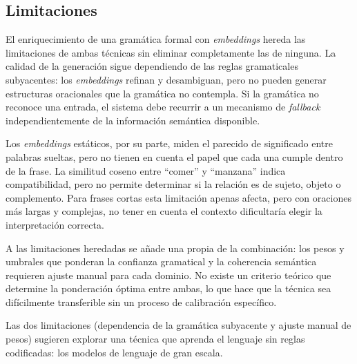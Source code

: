 \subsection{Limitaciones}
\label{sec:f2-limitaciones}

El enriquecimiento de una gramática formal con \textit{embeddings} hereda las limitaciones de ambas técnicas sin eliminar completamente las de ninguna. La calidad de la generación sigue dependiendo de las reglas gramaticales subyacentes: los \textit{embeddings} refinan y desambiguan, pero no pueden generar estructuras oracionales que la gramática no contempla. Si la gramática no reconoce una entrada, el sistema debe recurrir a un mecanismo de \textit{fallback} independientemente de la información semántica disponible.

Los \textit{embeddings} estáticos, por su parte, miden el parecido de significado entre palabras sueltas, pero no tienen en cuenta el papel que cada una cumple dentro de la frase. La similitud coseno entre ``comer'' y ``manzana'' indica compatibilidad, pero no permite determinar si la relación es de sujeto, objeto o complemento. Para frases cortas esta limitación apenas afecta, pero con oraciones más largas y complejas, no tener en cuenta el contexto dificultaría elegir la interpretación correcta.

A las limitaciones heredadas se añade una propia de la combinación: los pesos y umbrales que ponderan la confianza gramatical y la coherencia semántica requieren ajuste manual para cada dominio. No existe un criterio teórico que determine la ponderación óptima entre ambas, lo que hace que la técnica sea difícilmente transferible sin un proceso de calibración específico.

Las dos limitaciones (dependencia de la gramática subyacente y ajuste manual de pesos) sugieren explorar una técnica que aprenda el lenguaje sin reglas codificadas: los modelos de lenguaje de gran escala.
